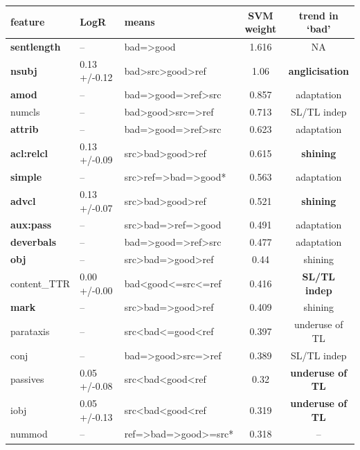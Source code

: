 \begin{longtable}{l|llcc}
		\midrule
		feature      & LogR         & means            & SVM weight &  trend in `bad' \\
		\midrule
		\textbf{sentlength}   & --           & bad=>good & 1.616 & NA  \\
		\textbf{nsubj}        & 0.13 +/-0.12 & bad>src>good>ref & 1.06  & \textbf{anglicisation} \\
		\textbf{amod}         & --           & bad=>good=>ref>src & 0.857 & adaptation \\
		\textcolor{Dandelion}{numcls}       & -- & bad>good>src=>ref & 0.713 & SL/TL indep \\
		\textbf{attrib}       & --           & bad=>good=>ref>src & 0.623 & adaptation \\
		\textbf{acl:relcl}    & 0.13 +/-0.09 & src>bad>good>ref & 0.615 & \textbf{shining} \\
		\textbf{simple}       & --           & src>ref=>bad=>good* & 0.563 & adaptation \\
		\textbf{advcl}        & 0.13 +/-0.07 & src>bad>good>ref & 0.521 & \textbf{shining} \\
		\textbf{aux:pass}     & --           & src>bad=>ref=>good & 0.491 & adaptation \\
		\textbf{deverbals}    & --           & bad=>good=>ref>src & 0.477 & adaptation \\
		\textbf{obj}          & --           & src>bad=>good>ref & 0.44  & shining \\
		\textcolor{cadmiumgreen}{content\_TTR} & 0.00 +/-0.00 & bad<good<=src<=ref & 0.416 & \textbf{SL/TL indep} \\
		\textbf{mark}         & --           & src>bad=>good>ref & 0.409 & shining \\
		\textcolor{Dandelion}{parataxis}    & --  & src<bad<=good<ref    & 0.397 & underuse of TL \\
		conj         & --           & bad=>good>src=>ref & 0.389 &  SL/TL indep \\
		\textcolor{cadmiumgreen}{passives}     & 0.05 +/-0.08 & src<bad<good<ref & 0.32 & \textbf{underuse of TL} \\
		\textcolor{Dandelion}{iobj}    & 0.05 +/-0.13 & src<bad<good<ref & 0.319 & \textbf{underuse of TL} \\
		\textcolor{Dandelion}{nummod}  & -- & ref=>bad=>good>=src* & 0.318 & -- \\

\end{longtable}
